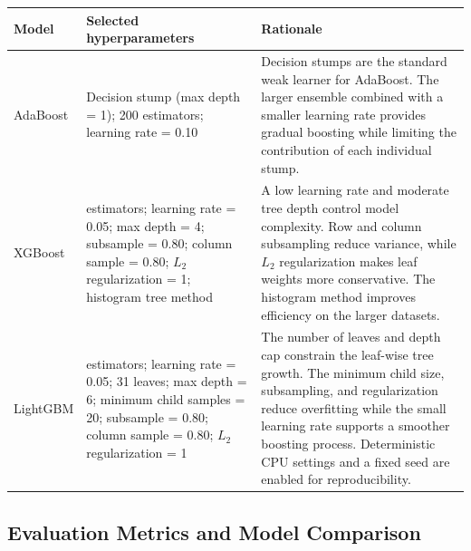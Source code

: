 \begin{table}[H]
\centering
\begin{minipage}{0.90\linewidth}
\centering
	\begin{captionbelowboxaivn}
		\label{tab:model_hyperparameters}
	\end{captionbelowboxaivn}

	\renewcommand{\arraystretch}{1.1}
	\small

	\begin{tabularx}{\linewidth}{@{}
        >{\raggedright\arraybackslash}X
        >{\raggedright\arraybackslash}X
        >{\raggedright\arraybackslash}X@{}}
\textbf{Model} & \textbf{Selected hyperparameters} & \textbf{Rationale} \\
\hline
AdaBoost &
Decision stump (max depth = 1); 200 estimators; learning rate = 0.10 &
Decision stumps are the standard weak learner for AdaBoost. The larger ensemble
combined with a smaller learning rate provides gradual boosting while limiting
the contribution of each individual stump. \\
\hline
XGBoost &
300 estimators; learning rate = 0.05; max depth = 4; subsample = 0.80;
column sample = 0.80; $L_2$ regularization = 1; histogram tree method &
A low learning rate and moderate tree depth control model complexity. Row and
column subsampling reduce variance, while $L_2$ regularization makes leaf
weights more conservative. The histogram method improves efficiency on the
larger datasets. \\
\hline
LightGBM &
300 estimators; learning rate = 0.05; 31 leaves; max depth = 6; minimum child
samples = 20; subsample = 0.80; column sample = 0.80; $L_2$ regularization = 1 &
The number of leaves and depth cap constrain the leaf-wise tree growth. The
minimum child size, subsampling, and regularization reduce overfitting while the
small learning rate supports a smoother boosting process. Deterministic CPU
settings and a fixed seed are enabled for reproducibility. \\
		\end{tabularx}
\end{minipage}
\end{table}

\subsection{Evaluation Metrics and Model Comparison}

